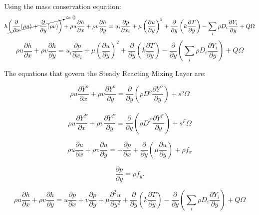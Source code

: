 Using the mass conservation equation:
%
\begin{equation} 
h
\cancelto{\approx0}{
\left(
\frac{\partial}{\partial x}(\rho u )
+
\frac{\partial}{\partial y}(\rho v )
\right)
}
+
\rho u
\frac{\partial h}{\partial x}
+
\rho v
\frac{\partial h}{\partial y}
=
u_i\frac{\partial p}{\partial x_i}
+
\mu
\left(\frac{\partial u}{\partial y}\right)^2
+
\frac{\partial }{\partial y}
\left(
k
\frac{\partial T}{\partial y}
\right)
-
\sum_i\rho D_i\frac{\partial Y_i}{\partial y}
+
Q\Omega
\end{equation} 
%
\begin{equation} 
\rho u
\frac{\partial h}{\partial x}
+
\rho v
\frac{\partial h}{\partial y}
=
u_i\frac{\partial p}{\partial x_i}
+
\mu
\left(\frac{\partial u}{\partial y}\right)^2
+
\frac{\partial }{\partial y}
\left(
k
\frac{\partial T}{\partial y}
\right)
-
\frac{\partial }{\partial y}
\left(
\sum_i\rho D_i\frac{\partial Y_i}{\partial y}
\right)
+
Q\Omega
\end{equation} 

The equations that govern the Steady Reacting Mixing Layer are: 

\begin{equation} 
\rho u\frac{\partial Y^{o}}{\partial x}+
\rho v\frac{\partial Y^{o}}{\partial y}
=
\frac{\partial}{\partial y}\left(\rho D^o\frac{\partial Y^o}{\partial y}\right)+
s^{o}\Omega
\end{equation} 
\\
\begin{equation} 
\rho u\frac{\partial Y^{F}}{\partial x}+
\rho v\frac{\partial Y^{F}}{\partial y}
=
\frac{\partial}{\partial y}\left(\rho D^F\frac{\partial Y^F}{\partial y}\right)+
s^{F}\Omega
\end{equation} 

\begin{equation} 
\rho u\frac{\partial u}{\partial x}+
\rho v\frac{\partial u}{\partial y}=-
\frac{\partial p}{\partial x}+
\frac{\partial}{\partial y}\left(\mu\frac{\partial u}{\partial y}\right)+
\rho f_x
\end{equation} 

\begin{equation} 
\frac{\partial p}{\partial y}=
\rho f_y.
\end{equation} 

\begin{equation}
\rho u \frac{\partial h}{\partial x}+
\rho v \frac{\partial h}{\partial y}=
u\frac{\partial p}{\partial x}+
v\frac{\partial p}{\partial y}+
\mu\frac{\partial^2 u}{\partial y^2}+
\frac{\partial}{\partial y}
\left(
   k\frac{\partial T}{\partial y}\right)
-
\frac{\partial}{\partial y}
\left(
\sum_i\rho D_i\frac{\partial Y_i}{\partial y}
\right)
+
Q\Omega
\end{equation} 

